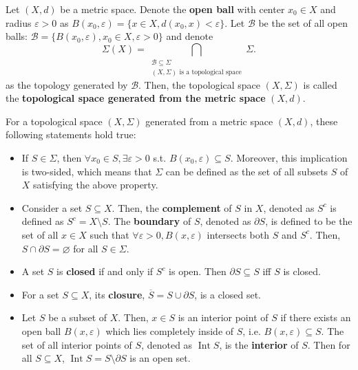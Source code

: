 Let \( (X, d) \) be a metric space. Denote the \textbf{open ball} with center
\( x_{0} \in X \) and radius \( \varepsilon > 0 \) as \( B(x_{0}, \varepsilon)
= \{x \in X, d(x_{0},x) < \varepsilon\}  \). Let \( \mathcal{B} \) be the set
of all open balls: \( \mathcal{B} = \{B(x_{0}, \varepsilon), x_{0} \in X,
\varepsilon > 0\}   \) and denote
\[
  \Sigma(X) = \bigcap\limits_{\substack{\mathcal{B} \subseteq \Sigma\\ (X,
  \Sigma) \text{ is a topological space}}} \Sigma
.\] as the topology generated by \( \mathcal{B} \). Then, the topological space
\( (X, \Sigma) \) is called the \textbf{topological space generated from the
metric space} \( (X, d) \).
  
\begin{theorem}
  For a topological space \( (X, \Sigma) \) generated from a metric space \( (X,
  d) \), these following statements hold true:
  \begin{itemize}
    \item If \( S \in \Sigma \), then  \( \forall x_{0} \in S, \exists
      \varepsilon > 0 \) s.t. \( B(x_{0}, \varepsilon) \subseteq S \). Moreover,
      this implication is two-sided, which means that \( \Sigma \) can be
      defined as the set of all subsets \( S \) of \( X \) satisfying the above
      property.
    \item Consider a set \( S \subseteq  X \). Then, the \textbf{complement} of \( S \)
      in \( X \), denoted as \( S^{c} \) is defined as \(
      S^{c} = X \setminus S \). The \textbf{boundary} of \( S \), denoted
      as \( \partial S \), is defined to be the set of all \( x \in X \) such
      that \( \forall \varepsilon > 0, B(x, \varepsilon) \) intersects both \(
      S \) and \( S^{c} \). Then, \( S \cap \partial S = \varnothing \)
      for all \( S \in \Sigma \).
    \item A set \( S \) is \textbf{closed} if and only if \( S^{c} \) is
      open. Then \( \partial S \subseteq S \) iff \( S \) is closed.
    \item For a set \( S \subseteq  X \), its \textbf{closure}, \( \overline{S} =
      S \cup  \partial S\), is a closed set.
    \item Let \( S \) be a subset of \( X \). Then, \( x \in S \) is an
      interior point of \( S \) if there exists an open ball \( B(x,
      \varepsilon) \) which lies completely inside of \( S \), i.e. \( B(x,
      \varepsilon) \subseteq  S \). The set of all interior points of \( S \),
      denoted as \( \operatorname{Int} S \), is the \textbf{interior} of \( S
      \). Then for all \( S \subseteq  X \), \( \operatorname{Int} S = S \setminus
      \partial S\) is an open set.
  \end{itemize}
\end{theorem}


